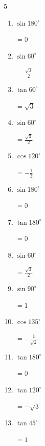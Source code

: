 \begin{multicols}{5}
\begin{enumerate}
  \item $\displaystyle \sin{180^\circ}$

        $\displaystyle =0$

  \item $\displaystyle \sin{60^\circ}$

        $\displaystyle =\frac{\sqrt{3}}{2}$

  \item $\displaystyle \tan{60^\circ}$

        $\displaystyle =\sqrt{3}$

  \item $\displaystyle \sin{60^\circ}$

        $\displaystyle =\frac{\sqrt{3}}{2}$

  \item $\displaystyle \cos{120^\circ}$

        $\displaystyle =-\frac{1}{2}$

\columnbreak %

\resetques

  \item $\displaystyle \sin{180^\circ}$

        $\displaystyle =0$

  \item $\displaystyle \tan{180^\circ}$

        $\displaystyle =0$

  \item $\displaystyle \sin{60^\circ}$

        $\displaystyle =\frac{\sqrt{3}}{2}$

  \item $\displaystyle \sin{90^\circ}$

        $\displaystyle =1$

  \item $\displaystyle \cos{135^\circ}$

        $\displaystyle =-\frac{1}{\sqrt{2}}$

  \item $\displaystyle \tan{180^\circ}$

        $\displaystyle =0$

  \item $\displaystyle \tan{120^\circ}$

        $\displaystyle =-\sqrt{3}$

  \item $\displaystyle \tan{45^\circ}$

        $\displaystyle =1$


\end{enumerate}
\end{multicols}
